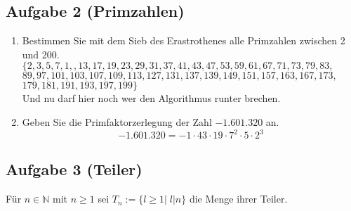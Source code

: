 \documentclass[11pt,a4paper,ngerman]{article}
\newcommand{\N}{\mathbb{N}}
\begin{document}
\subsection*{Aufgabe 2 (Primzahlen)}

\begin{enumerate}[\bfseries a)]

\item Bestimmen Sie mit dem Sieb des Erastrothenes alle Primzahlen zwischen 2 und 200. \\
$\{2, 3, 5, 7, 1, ,13, 17, 19,23, 29, 31, 37, 41, 43, 47, 53, 59, 61, 67, 71, 73, 79, 83,$\\
$ 89, 97, 101, 103, 107, 109, 113, 127, 131, 137, 139, 149, 151, 157, 163, 167, 173,$\\
$ 179, 181, 191, 193, 197, 199\}$\\

Und nu darf hier noch wer den Algorithmus runter brechen.

\item Geben Sie die Primfaktorzerlegung der Zahl $-1.601.320$ an.\\

$$-1.601.320 = -1 \cdot 43 \cdot 19 \cdot 7^2 \cdot 5 \cdot 2^3$$

\end{enumerate}





\subsection*{Aufgabe 3 (Teiler)}

Für $n \in \N$ mit $n \geq 1$ sei $T_n := \{ l \geq 1 | \; l | n\}$ die Menge ihrer Teiler.
\end{document}
